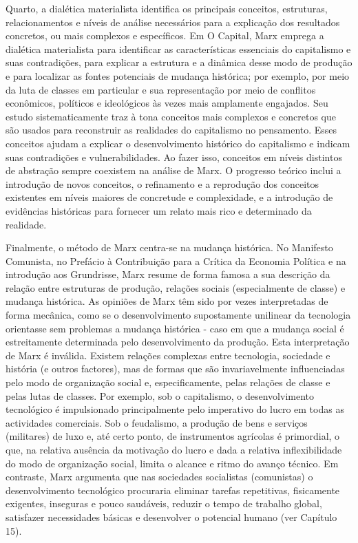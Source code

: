  \par 
Quarto, a dialética materialista identifica os principais conceitos, estruturas, relacionamentos e níveis de análise necessários para a explicação dos resultados concretos, ou mais complexos e específicos. Em O Capital, Marx emprega a dialética materialista para identificar as características essenciais do capitalismo e suas contradições, para explicar a estrutura e a dinâmica desse modo de produção e para localizar as fontes potenciais de mudança histórica; por exemplo, por meio da luta de classes em particular e sua representação por meio de conflitos econômicos, políticos e ideológicos às vezes mais amplamente engajados. Seu estudo sistematicamente traz à tona conceitos mais complexos e concretos que são usados ​​para reconstruir as realidades do capitalismo no pensamento. Esses conceitos ajudam a explicar o desenvolvimento histórico do capitalismo e indicam suas contradições e vulnerabilidades. Ao fazer isso, conceitos em níveis distintos de abstração sempre coexistem na análise de Marx. O progresso teórico inclui a introdução de novos conceitos, o refinamento e a reprodução dos conceitos existentes em níveis maiores de concretude e complexidade, e a introdução de evidências históricas para fornecer um relato mais rico e determinado da realidade.
 \par 
Finalmente, o método de Marx centra-se na mudança histórica. No Manifesto Comunista, no Prefácio à Contribuição para a Crítica da Economia Política e na introdução aos Grundrisse, Marx resume de forma famosa a sua descrição da relação entre estruturas de produção, relações sociais (especialmente de classe) e mudança histórica. As opiniões de Marx têm sido por vezes interpretadas de forma mecânica, como se o desenvolvimento supostamente unilinear da tecnologia orientasse sem problemas a mudança histórica - caso em que a mudança social é estreitamente determinada pelo desenvolvimento da produção. Esta interpretação de Marx é inválida. Existem relações complexas entre tecnologia, sociedade e história (e outros factores), mas de formas que são invariavelmente influenciadas pelo modo de organização social e, especificamente, pelas relações de classe e pelas lutas de classes. Por exemplo, sob o capitalismo, o desenvolvimento tecnológico é impulsionado principalmente pelo imperativo do lucro em todas as actividades comerciais. Sob o feudalismo, a produção de bens e serviços (militares) de luxo e, até certo ponto, de instrumentos agrícolas é primordial, o que, na relativa ausência da motivação do lucro e dada a relativa inflexibilidade do modo de organização social, limita o alcance e ritmo do avanço técnico. Em contraste, Marx argumenta que nas sociedades socialistas (comunistas) o desenvolvimento tecnológico procuraria eliminar tarefas repetitivas, fisicamente exigentes, inseguras e pouco saudáveis, reduzir o tempo de trabalho global, satisfazer necessidades básicas e desenvolver o potencial humano (ver Capítulo {\color{blue}15}).
 \par 
